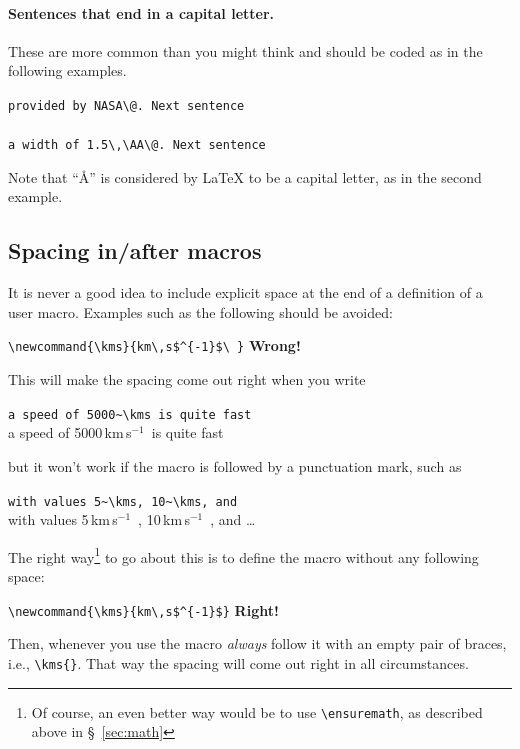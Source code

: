 \documentclass[proceedings, preprint]{rmaa}
\newcommand{\CS}[1]{\texttt{\textbackslash #1}}
\newenvironment{Example}
{\begin{list}{}{\setlength{\leftmargin}{5pt}\setlength{\rightmargin}{5pt}}\item[]}
  {\end{list}}
\begin{document}
\paragraph{Sentences that end in a capital letter.} These are more common
than you might think and should be coded as in the following examples. 
\begin{Example}
  \verb+provided by NASA\@. Next sentence+\\
  \\[0.5\baselineskip]
  \verb+a width of 1.5\,\AA\@. Next sentence+\\
\end{Example}
Note that ``\AA'' is considered by \LaTeX{} to be a capital letter, as
in the second example. 



\subsection{Spacing in/after macros}
\label{sec:macrospace}
It is never a good idea to include explicit space at the end of a
definition of a user macro. Examples such as the following should be
avoided:
\begin{Example}
  \verb+\newcommand{\kms}{km\,s$^{-1}$\ }+ \hfill\textbf{Wrong!}
\end{Example}
This will make the spacing come out right when you write
\begin{Example}
  \newcommand{\kms}{km\,s$^{-1}$\ }
  \verb+a speed of 5000~\kms is quite fast+\\
  a speed of 5000\,\kms is quite fast
\end{Example}
but it won't work if the macro is followed by a punctuation mark, such
as 
\begin{Example}
  \newcommand{\kms}{km\,s$^{-1}$\ }
  \verb+with values 5~\kms, 10~\kms, and+\\
  with values 5\,\kms, 10\,\kms, and \dots
\end{Example}

The right way\footnote{Of course, an even better way would be to use
  \CS{ensuremath}, as described above in \S~\ref{sec:math}} to go
about this is to define the macro without any following space:
\begin{Example}
  \verb+\newcommand{\kms}{km\,s$^{-1}$}+ \hfill\textbf{Right!}
\end{Example}
Then, whenever you use the macro \emph{always} follow it with an empty
pair of braces, i.e., \verb+\kms{}+. That way the spacing will come
out right in all circumstances. 
\end{document}
